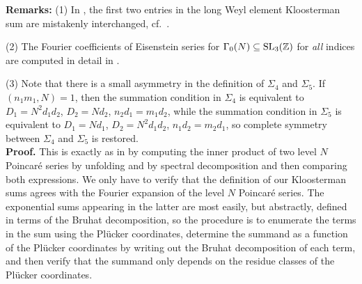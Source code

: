 \documentclass[11pt]{amsart}
\theoremstyle{plain}
\numberwithin{equation}{section}
\theoremstyle{definition}
\begin{document}
\textbf{Remarks:} (1) In \cite{Bl}, the first two entries in the long Weyl element Kloosterman sum are mistakenly interchanged, cf.\ \cite[p.\ 64]{BFG}. 



(2) The Fourier coefficients of Eisenstein series for $\Gamma_0(N) \subseteq {\rm SL}_3(\Bbb{Z})$ for \emph{all} indices are computed  in detail in \cite{Ba}. 


(3) Note that there is a small asymmetry in the definition of $\Sigma_4$ and $\Sigma_5$. If $(n_1m_1, N) = 1$, then the summation condition in $\Sigma_4$ is equivalent to $D_1 = N^2d_1d_2$, $D_2 = Nd_2$, $n_2d_1 = m_1d_2$, while the summation condition in $\Sigma_5$ is equivalent to $D_1 = Nd_1 $, $D_2 = N^2d_1d_2$, $n_1d_2 = m_2d_1$, so complete symmetry between $\Sigma_4$ and $\Sigma_5$ is restored. \\


\textbf{Proof.} This is exactly as in \cite[Proposition 4]{Bl} by computing the inner product of two level $N$ Poincar\'e series by unfolding and by spectral decomposition and then comparing both expressions. 
 We only have to verify that the definition of our Kloosterman sums agrees with the Fourier expansion of the level $N$ Poincar\'e series.
The exponential sums appearing in the latter are most easily, but abstractly, defined in terms of the Bruhat decomposition, so the procedure is to enumerate the terms in the sum using the Pl\"ucker coordinates, determine the summand as a function of the Pl\"ucker coordinates by writing out the Bruhat decomposition of each term, and then verify that the summand only depends on the residue classes of the Pl\"ucker coordinates.
\end{document}

